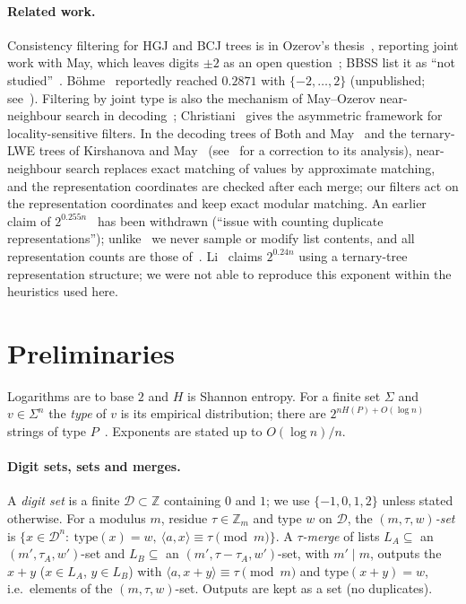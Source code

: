 \documentclass[11pt]{article}
\theoremstyle{definition}
\theoremstyle{remark}
\newcommand{\Z}{\mathbb{Z}}
\newcommand{\cD}{\mathcal{D}}
\begin{document}
\paragraph{Related work.} Consistency filtering for HGJ and BCJ trees is in Ozerov's thesis~\cite[Ch.~2,
\S4.2]{Oze16}, reporting joint work with May, which leaves digits $\pm2$ as an open question~\cite[after
Cor.~65]{Oze16}; BBSS list it as ``not studied''~\cite[Table~1]{BBSS20}. Böhme~\cite{Boh11} reportedly reached $0.2871$
with $\{-2,\dots,2\}$ (unpublished; see~\cite[fn.~5]{BBSS20}). Filtering by joint type is also the mechanism of
May--Ozerov near-neighbour search in decoding~\cite{MO15}; Christiani~\cite{Chr17} gives the asymmetric framework for
locality-sensitive filters. In the decoding trees of Both and
May~\cite{BM17b,BM18} and the ternary-LWE trees of Kirshanova and May~\cite{KM21} (see~\cite[App.~A]{HKLS26} for a correction to its
analysis), near-neighbour search replaces exact
matching of values by approximate matching, and the representation coordinates are checked after each merge; our
filters act on the representation coordinates and keep exact modular matching. An earlier claim of
$2^{0.255n}$~\cite{EM19} has been withdrawn (``issue with counting duplicate representations''); unlike~\cite{EM19} we
never sample or modify list contents, and all representation counts are those of~\cite{BBSS20}.
Li~\cite{Li25} claims $2^{0.24n}$ using a ternary-tree representation structure; we were not able to reproduce this
exponent within the heuristics used here.

\section{Preliminaries}\label{sec:prelim}
Logarithms are to base $2$ and $H$ is Shannon entropy. For a finite set $\Sigma$ and $v\in\Sigma^n$ the \emph{type} of
$v$ is its empirical distribution; there are $2^{nH(P)+O(\log n)}$ strings of type $P$~\cite{CK11}. Exponents are
stated up to $O(\log n)/n$.

\paragraph{Digit sets, sets and merges.} A \emph{digit set} is a finite $\cD\subset\Z$ containing $0$ and $1$; we use
$\{-1,0,1,2\}$ unless stated otherwise. For a modulus $m$, residue $\tau\in\Z_m$ and type $w$ on $\cD$, the
\emph{$(m,\tau,w)$-set} is $\{x\in\cD^n:\ \mathrm{type}(x)=w,\ \langle a,x\rangle\equiv\tau\pmod m\}$.
A \emph{$\tau$-merge} of lists $L_A\subseteq$ an $(m',\tau_A,w')$-set and $L_B\subseteq$ an $(m',\tau-\tau_A,w')$-set, with
$m'\mid m$, outputs the $x+y$ ($x\in L_A$, $y\in L_B$) with $\langle a,x+y\rangle\equiv\tau\pmod m$ and
$\mathrm{type}(x+y)=w$, i.e.\ elements of the $(m,\tau,w)$-set. Outputs are kept as a set (no duplicates).
\end{document}
